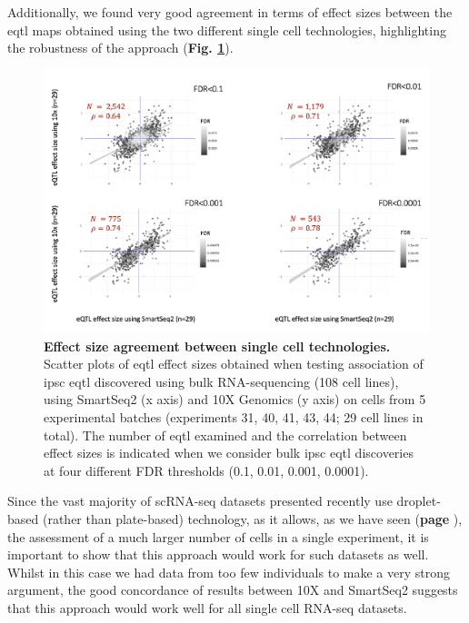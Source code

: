\newpage

Additionally, we found very good agreement in terms of effect sizes between the \gls{eqtl} maps obtained using the two different single cell technologies, highlighting the robustness of the approach (\textbf{Fig. \ref{fig:sc_eqtl_technologies}}). \\

\begin{figure}[h]
\centering
\includegraphics[width=15cm]{Chapter3/Fig/beta_comparison_ss2_vs_10x.png}
\caption[iPSC sc-eQTL replication across technologies]{\textbf{Effect size agreement between single cell technologies.}\\
Scatter plots of \gls{eqtl} effect sizes obtained when testing association of \gls{ipsc} \gls{eqtl} discovered using bulk RNA-sequencing (108 cell lines), using SmartSeq2 (x axis) and 10X Genomics (y axis) on cells from 5 experimental batches (experiments 31, 40, 41, 43, 44; 29 cell lines in total). 
The number of \gls{eqtl} examined and the correlation between effect sizes is indicated when we consider bulk \gls{ipsc} \gls{eqtl} discoveries at four different FDR thresholds (0.1, 0.01, 0.001, 0.0001).}
\label{fig:sc_eqtl_technologies}
\end{figure}

Since the vast majority of scRNA-seq datasets presented recently use droplet-based (rather than plate-based) technology, as it allows, as we have seen (\textbf{page \pageref{fig:scrnaseq_plate_vs_droplet}}), the assessment of a much larger number of cells in a single experiment, it is important to show that this approach would work for such datasets as well. 
Whilst in this case we had data from too few individuals to make a very strong argument, the good concordance of results between 10X and SmartSeq2 suggests that this approach would work well for all single cell RNA-seq datasets.

